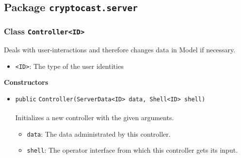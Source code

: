 \subsection{Package \lstinline!cryptocast.server!}

\subsubsection{Class \lstinline|Controller<ID>|}
Deals with user-interactions and therefore changes data in Model if necessary. \\
\noindent\begin{minipage}[t]{5cm}
\vspace{0.3em}
\hspace*{2em}
\vspace{0.3em}
\end{minipage}

\begin{itemize}
\item \lstinline|<ID>|: The type of the user identities
\end{itemize}



\textbf{\sffamily Constructors}
\begin{itemize}
\item \lstinline|public| \lstinline|Controller|\lstinline|(ServerData<ID> data, Shell<ID> shell)|\\ \\[-0.6em]
Initializes a new controller with the given arguments.
\begin{itemize}
\item \lstinline|data|: The data administrated by this controller.
\item \lstinline|shell|: The operator interface from which this controller gets its input.
\end{itemize}



\end{itemize}


